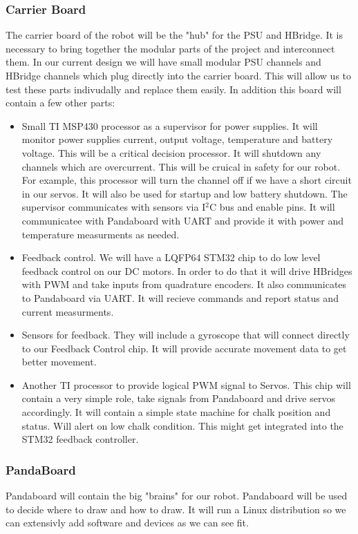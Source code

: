\documentclass[12pt]{article}
\begin{document}
     \subsubsection{Carrier Board}
     The carrier board of the robot will be the "hub" for the PSU and HBridge. It is necessary to bring together the modular parts of the project and interconnect them. In our current design we will have small modular PSU channels and HBridge channels which plug directly into the carrier board. This will allow us to test these parts indivudally and replace them easily. In addition this board will contain a few other parts:
     \begin{itemize}
    \item Small TI MSP430 processor as a supervisor for power supplies. It will monitor power supplies current, output voltage, temperature and battery voltage. This will be a critical decision processor. It will shutdown any channels which are overcurrent. This will be cruical in safety for our robot. For example, this processor will turn the channel off if we have a short circuit in our servos. It will also be used for startup and low battery shutdown. The supervisor communicates with sensors via I$^{\textrm{2}}$C bus and enable pins. It will communicatee with Pandaboard with UART and provide it with power and temperature measurments as needed.
    \item Feedback control. We will have a LQFP64 STM32 chip to do low level feedback control on our DC motors. In order to do that it will drive HBridges with PWM and take inputs from quadrature encoders. It also communicates to Pandaboard via UART. It will recieve commands and report status and current measurments. 
    \item Sensors for feedback. They will include a gyroscope that will connect directly to our Feedback Control chip. It will provide accurate movement data to get better movement.
    \item Another TI processor to provide logical PWM signal to Servos. This chip will contain a very simple role, take signals from Pandaboard and drive servos accordingly. It will contain a simple state machine for chalk position and status. Will alert on low chalk condition. This might get integrated into the STM32 feedback controller.
     \end{itemize}
     \subsubsection{PandaBoard}
     Pandaboard will contain the big "brains" for our robot. Pandaboard will be used to decide where to draw and how to draw. It will run a Linux distribution so we can extensivly add software and devices as we can see fit.
\end{document}
